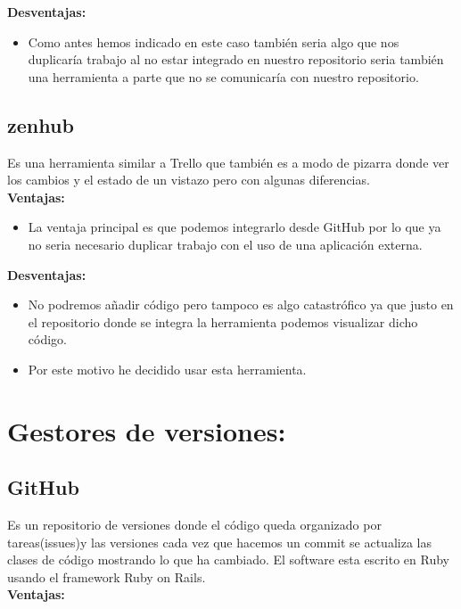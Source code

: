 \textbf{Desventajas:}

\begin{itemize}
\item Como antes hemos indicado en este caso también seria algo que nos duplicaría trabajo al no estar integrado en nuestro repositorio seria también una herramienta a parte que no se comunicaría con nuestro repositorio.
\end{itemize}


\subsection{zenhub}
Es una herramienta similar a Trello que también es a modo de pizarra donde ver los cambios y el estado de un vistazo pero con algunas diferencias.
\\

\textbf{Ventajas:}

\begin{itemize}
\item La ventaja principal es que podemos integrarlo desde GitHub por lo que ya no seria necesario duplicar trabajo con el uso de una aplicación externa.
\end{itemize}

\textbf{Desventajas:}

\begin{itemize}
\item No podremos añadir código pero tampoco es algo catastrófico ya que justo en el repositorio donde se integra la herramienta podemos visualizar dicho código.

\item Por este motivo he decidido usar esta herramienta.
\end{itemize}

\section{Gestores de versiones:}
\subsection{GitHub}
Es un repositorio de versiones donde el código queda organizado por tareas(issues)y las versiones cada vez que hacemos un commit se actualiza las clases de código mostrando lo que ha cambiado.
El software esta escrito en Ruby usando el framework Ruby on Rails.
\\


\textbf{Ventajas:}

